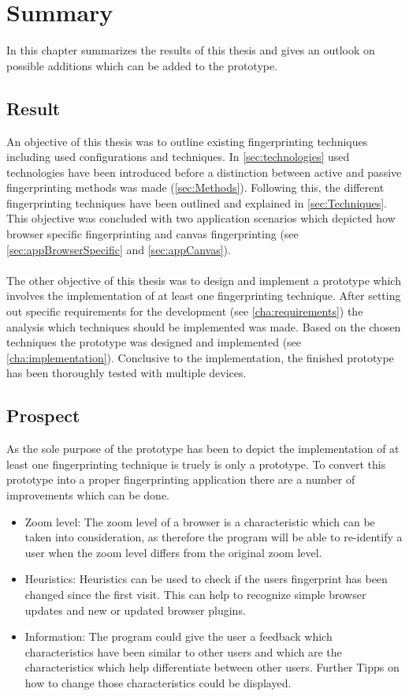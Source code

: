 \chapter{Summary}
\label{cha:summary}
In this chapter summarizes the results of this thesis and gives an outlook on possible additions which can be added to the prototype.

\section{Result}
An objective of this thesis was to outline existing fingerprinting techniques including used configurations and techniques. In \autoref{sec:technologies} used technologies have been introduced before a distinction between active and passive fingerprinting methods was made (\autoref{sec:Methods}). Following this, the different fingerprinting techniques have been outlined and explained in \autoref{sec:Techniques}. This objective was concluded with two application scenarios which depicted how browser specific fingerprinting and canvas fingerprinting (see \autoref{sec:appBrowserSpecific} and \autoref{sec:appCanvas}).\\\\
The other objective of this thesis was to design and implement a prototype which involves the implementation of at least one fingerprinting technique. After setting out specific requirements for the development (see \autoref{cha:requirements}) the analysis which techniques should be implemented was made. Based on the chosen techniques the prototype was designed and implemented (see \autoref{cha:implementation}). Conclusive to the implementation, the finished prototype has been thoroughly tested with multiple devices.

\section{Prospect}
As the sole purpose of the prototype has been to depict the implementation of at least one fingerprinting technique is truely is only a prototype. To convert this prototype into a proper fingerprinting application there are a number of improvements which can be done.\\

\begin{itemize}
	\item {Zoom level: }The zoom level of a browser is a characteristic which can be taken into consideration, as therefore the program will be able to re-identify a user when the zoom level differs from the original zoom level.
	\item {Heuristics: }Heuristics can be used to check if the users fingerprint has been changed since the first visit. This can help to recognize simple browser updates and new or updated browser plugins.
	\item {Information: }The program could give the user a feedback which characteristics have been similar to other users and which are the characteristics which help differentiate between other users. Further Tipps on how to change those characteristics could be displayed.
\end{itemize} 


